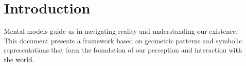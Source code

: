 ﻿\section{Introduction}

Mental models guide us in navigating reality and understanding our existence. This document presents a framework based on geometric patterns and symbolic representations that form the foundation of our perception and interaction with the world.